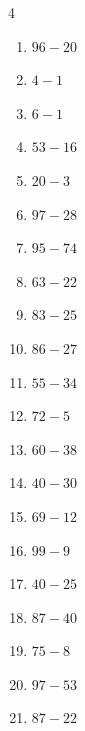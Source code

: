 \begin{multicols}{4}
\begin{enumerate}
  \item $96-20$
        \phantom{$=76$}

  \item $4-1$
        \phantom{$=3$}

  \item $6-1$
        \phantom{$=5$}

  \item $53-16$
        \phantom{$=37$}

  \item $20-3$
        \phantom{$=17$}

  \item $97-28$
        \phantom{$=69$}

  \item $95-74$
        \phantom{$=21$}

  \item $63-22$
        \phantom{$=41$}

  \item $83-25$
        \phantom{$=58$}

  \item $86-27$
        \phantom{$=59$}

  \item $55-34$
        \phantom{$=21$}

  \item $72-5$
        \phantom{$=67$}

  \item $60-38$
        \phantom{$=22$}

\columnbreak %

\resetques

  \item $40-30$
        \phantom{$=10$}

  \item $69-12$
        \phantom{$=57$}

  \item $99-9$
        \phantom{$=90$}

  \item $40-25$
        \phantom{$=15$}

  \item $87-40$
        \phantom{$=47$}

  \item $75-8$
        \phantom{$=67$}

  \item $97-53$
        \phantom{$=44$}

  \item $87-22$
        \phantom{$=65$}


\end{enumerate}
\end{multicols}
